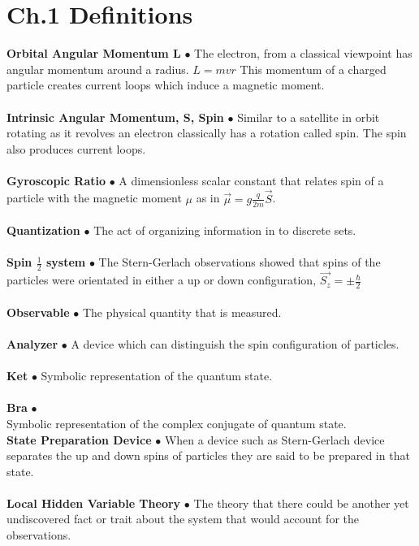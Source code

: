 \documentclass[paper=a4, fontsize=11pt]{scrartcl} %
\numberwithin{equation}{section} %
\numberwithin{figure}{section} %
\numberwithin{table}{section} %
\begin{document}
\section{Ch.1 Definitions}
\textbf{Orbital Angular Momentum L} $\bullet$ The electron, from a classical viewpoint has angular momentum around a radius. $L = mvr$ This momentum of a charged particle creates current loops which induce a magnetic moment.\\
\\
 \textbf{Intrinsic Angular Momentum, S, Spin} $\bullet$ Similar to a satellite in orbit rotating as it revolves an electron classically has a rotation called spin. The spin also produces current loops.\\
\\ 
 \textbf{Gyroscopic Ratio} $\bullet$ A dimensionless scalar constant that relates spin of a particle with the magnetic moment $\mu$ as in $\vec{\mu} = g\frac{q}{2m}\vec{S}$.\\
\\
\textbf{Quantization} $\bullet$ The act of organizing information in to discrete sets.\\
\\
\textbf{Spin $\frac{1}{2}$ system} $\bullet$ The Stern-Gerlach observations showed that spins of the particles were orientated in either a up or down configuration, $\vec{S_z}= \pm \frac{\hbar}{2} $\\
\\ 
 \textbf{Observable} $\bullet$ The physical quantity that is measured.\\
 \\
 \textbf{Analyzer} $\bullet$ A device which can distinguish the spin configuration of particles.\\
 \\
 \textbf{Ket} $\bullet$ Symbolic representation of the quantum state.\\
 \\
 \textbf{Bra} $\bullet$ \\ Symbolic representation of the complex conjugate of quantum state.
 \\
 \textbf{State Preparation Device} $\bullet$ When a device such as Stern-Gerlach device separates the up and down spins of particles they are said to be prepared in that state. \\
 \\
 \textbf{Local Hidden Variable Theory} $\bullet$ The theory that there could be another yet undiscovered fact or trait about the system that would account for the observations.\\
\end{document}
